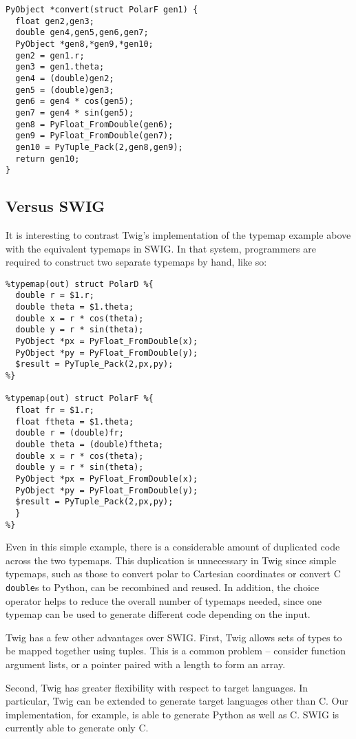 \begin{verbatim}
PyObject *convert(struct PolarF gen1) {
  float gen2,gen3;
  double gen4,gen5,gen6,gen7;
  PyObject *gen8,*gen9,*gen10;
  gen2 = gen1.r;
  gen3 = gen1.theta;
  gen4 = (double)gen2;
  gen5 = (double)gen3;
  gen6 = gen4 * cos(gen5);  
  gen7 = gen4 * sin(gen5);
  gen8 = PyFloat_FromDouble(gen6);
  gen9 = PyFloat_FromDouble(gen7);
  gen10 = PyTuple_Pack(2,gen8,gen9);
  return gen10;
}
\end{verbatim}

\subsection{Versus SWIG}

It is interesting to contrast Twig's implementation of the typemap
example above with the equivalent typemaps in SWIG. In that
system, programmers are required to construct two separate
typemaps by hand, like so:

\begin{verbatim}
%typemap(out) struct PolarD %{
  double r = $1.r;
  double theta = $1.theta;
  double x = r * cos(theta);
  double y = r * sin(theta);
  PyObject *px = PyFloat_FromDouble(x);
  PyObject *py = PyFloat_FromDouble(y);
  $result = PyTuple_Pack(2,px,py);
%}

%typemap(out) struct PolarF %{
  float fr = $1.r;
  float ftheta = $1.theta;
  double r = (double)fr;
  double theta = (double)ftheta;
  double x = r * cos(theta);
  double y = r * sin(theta);
  PyObject *px = PyFloat_FromDouble(x);
  PyObject *py = PyFloat_FromDouble(y);
  $result = PyTuple_Pack(2,px,py);
  }
%}
\end{verbatim}

Even in this simple example, there is a considerable amount of
duplicated code across the two typemaps. This duplication is
unnecessary in Twig since simple typemaps, such as those to
convert polar to Cartesian coordinates or convert C
\texttt{double}s to Python, can be recombined and reused. In
addition, the choice operator helps to reduce the overall number
of typemaps needed, since one typemap can be used to generate
different code depending on the input.

Twig has a few other advantages over SWIG. First, Twig allows sets
of types to be mapped together using tuples. This is a common
problem -- consider function argument lists, or a pointer paired
with a length to form an array.

Second, Twig has greater flexibility with respect to target
languages. In particular, Twig can be extended to generate target
languages other than C. Our implementation, for example, is able
to generate Python as well as C. SWIG is currently able to
generate only C.

